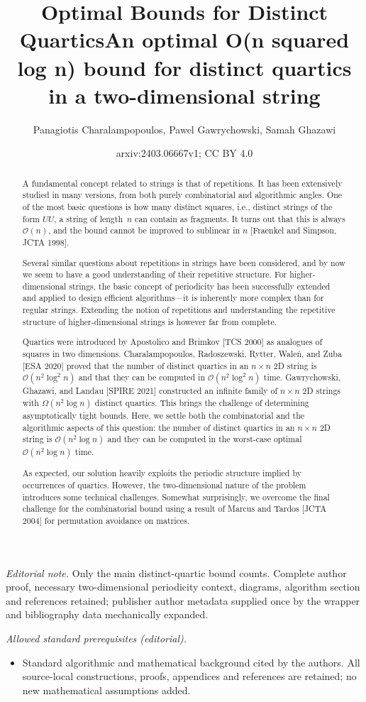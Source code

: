 \documentclass[11pt,letterpaper]{article}
\title{Optimal Bounds for Distinct Quartics}
\title{An optimal O(n squared log n) bound for distinct quartics in a two-dimensional string}
\author{Panagiotis Charalampopoulos, Pawel Gawrychowski, Samah Ghazawi}
\date{arxiv:2403.06667v1; CC BY 4.0}
\newcommand{\cO}{\mathcal{O}}
\begin{document}
\maketitle
\noindent\textit{Editorial note.} Only the main distinct-quartic bound counts. Complete author proof, necessary two-dimensional periodicity context, diagrams, algorithm section and references retained; publisher author metadata supplied once by the wrapper and bibliography data mechanically expanded.\par\medskip
\noindent\textit{Allowed standard prerequisites (editorial).}\begin{itemize}
\item Standard algorithmic and mathematical background cited by the authors. All source-local constructions, proofs, appendices and references are retained; no new mathematical assumptions added.
\end{itemize}\medskip
\begin{abstract}
A fundamental concept related to strings is that of repetitions. It has been extensively studied in many versions, from both purely combinatorial and algorithmic angles. One of the most basic questions is how many distinct squares, i.e., distinct strings of the form $UU$, a string of length~$n$ can contain as fragments. It turns out that this is always $\cO(n)$, and the bound cannot be improved to sublinear in $n$ [Fraenkel and Simpson, JCTA 1998].

Several similar questions about repetitions in strings have been considered, and by now we seem to have a good understanding of their repetitive structure. For higher-dimensional strings, the basic concept of periodicity has been successfully extended and applied to design efficient algorithms---it is inherently more complex than for regular strings. Extending the notion of repetitions and understanding the repetitive structure of higher-dimensional strings is however far from complete.

Quartics were introduced by Apostolico and Brimkov [TCS 2000] as analogues of squares in two dimensions. Charalampopoulos, Radoszewski, Rytter, Waleń, and Zuba [ESA 2020] proved that the number of distinct quartics in an $n\times n$ 2D string is $\cO(n^2 \log^2 n)$ and that they can be computed in $\cO(n^2 \log^2 n)$ time. Gawrychowski, Ghazawi, and Landau [SPIRE 2021] constructed an infinite family of $n \times n$ 2D strings with $\Omega(n^2 \log n)$ distinct quartics. This brings the challenge of determining asymptotically tight bounds. Here, we settle both the combinatorial and the algorithmic aspects of this question: the number of distinct quartics in an $n\times n$ 2D string is $\cO(n^2 \log n)$ and they can be computed in the worst-case optimal $\cO(n^2 \log n)$ time.

As expected, our solution heavily exploits the periodic structure implied by occurrences of quartics.
However, the two-dimensional nature of the problem introduces some technical challenges.
Somewhat surprisingly, we overcome the final challenge for the combinatorial bound using a result of Marcus and Tardos [JCTA 2004] for permutation avoidance on matrices.
\end{abstract}
\end{document}
